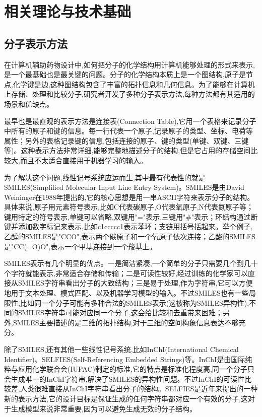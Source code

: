 \chapter{相关理论与技术基础}

\section{分子表示方法}

在计算机辅助药物设计中,如何把分子的化学结构用计算机能够处理的形式来表示,是一个最基础也是最关键的问题。分子的化学结构本质上是一个图结构,原子是节点,化学键是边,这种图结构包含了丰富的拓扑信息和几何信息。为了能够在计算机上存储、处理和比较分子,研究者开发了多种分子表示方法,每种方法都有其适用的场景和优缺点。

最早也是最直观的表示方法是连接表(Connection Table),它用一个表格来记录分子中所有的原子和键的信息。每一行代表一个原子,记录原子的类型、坐标、电荷等属性；另外的表格记录键的信息,包括连接的原子、键的类型(单键、双键、三键等)。这种表示方法非常详细,能够完整地描述分子的结构,但是它占用的存储空间比较大,而且不太适合直接用于机器学习的输入。

为了解决这个问题,线性记号系统应运而生,其中最有代表性的就是SMILES(Simplified Molecular Input Line Entry System)。SMILES是由David Weininger在1988年提出的,它的核心思想是用一串ASCII字符来表示分子的结构。具体来说,原子用元素符号表示,比如C代表碳原子,O代表氧原子,N代表氮原子等；键用特定的符号表示,单键可以省略,双键用"="表示,三键用"\#"表示；环结构通过断键并添加数字标记来表示,比如c1ccccc1表示苯环；支链用括号括起来。举个例子,乙醇的SMILES是"CCO",表示两个碳原子和一个氧原子依次连接；乙酸的SMILES是"CC(=O)O",表示一个甲基连接到一个羧基上。

SMILES表示有几个明显的优点。一是简洁紧凑,一个简单的分子只需要几个到几十个字符就能表示,非常适合存储和传输；二是可读性较好,经过训练的化学家可以直接从SMILES字符串看出分子的大致结构；三是易于处理,作为字符串,它可以方便地用于文本处理、模式匹配、以及机器学习模型的输入。不过SMILES也有一些局限性,比如同一个分子可能有多种合法的SMILES表示(这被称为SMILES异构性),不同的SMILES字符串可能对应同一个分子,这会给比较和去重带来困难；另外,SMILES主要描述的是二维的拓扑结构,对于三维的空间构象信息表达不够充分。

除了SMILES,还有其他一些线性记号系统,比如InChI(International Chemical Identifier)、SELFIES(Self-Referencing Embedded Strings)等。InChI是由国际纯粹与应用化学联合会(IUPAC)制定的标准,它的特点是标准化程度高,同一个分子只会生成唯一的InChI字符串,解决了SMILES的异构性问题。不过InChI的可读性比较差,人类很难直接从InChI字符串看出分子的结构。SELFIES是近年来提出的一种新的表示方法,它的设计目标是保证生成的任何字符串都对应一个有效的分子,这对于生成模型来说非常重要,因为可以避免生成无效的分子结构。


